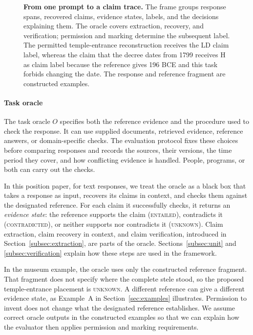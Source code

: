 \documentclass{clv2025}
\newcommand{\LD}{\textsc{LD}}
\newcommand{\Hall}{\textsc{H}}
\begin{document}
\begin{figure}[!t]
{}
\caption{\textbf{From one prompt to a claim trace.}
The frame groups response spans, recovered claims, evidence states, labels,
and the decisions explaining them. The oracle covers extraction, recovery,
and verification; permission and marking determine the subsequent label.
The permitted temple-entrance reconstruction receives the \LD{} claim label, whereas the
claim that the decree dates from 1799 receives \Hall{} as claim label because the
reference gives 196 BCE and this task forbids changing the date.
The response and reference fragment are constructed examples.}

\label{fig:claim-label-annotation}
\end{figure}

\paragraph{Task oracle}
The task oracle $O$ specifies both the reference evidence and the procedure
used to check the response. It can use supplied documents, retrieved
evidence, reference answers, or domain-specific checks. The evaluation
protocol fixes these choices before comparing responses and records the
sources, their versions, the time period they cover, and how conflicting
evidence is handled. People, programs, or both can carry out the checks.

In this position paper, for text responses, we treat the oracle as a black box that takes a response as input,
recovers its claims in context, and checks them against the designated
reference. For each claim it successfully checks, it returns an
\emph{evidence state}: the reference supports the claim (\textsc{entailed}),
contradicts it (\textsc{contradicted}), or neither supports nor contradicts
it (\textsc{unknown}). Claim extraction, claim recovery in context, and
claim verification, introduced in Section~\ref{subsec:extraction}, are parts
of the oracle. Sections~\ref{subsec:unit} and \ref{subsec:verification}
explain how these steps are used in the framework.

In the museum example, the oracle uses only the constructed reference
fragment. That fragment does not specify where the complete stele stood,
so the proposed temple-entrance placement is \textsc{unknown}. A different
reference can give a different evidence state, as Example~A in
Section~\ref{sec:examples} illustrates. Permission to invent does not change
what the designated reference establishes. We assume correct oracle
outputs in the constructed examples so that we can explain how the
evaluator then applies permission and marking requirements.
\end{document}
